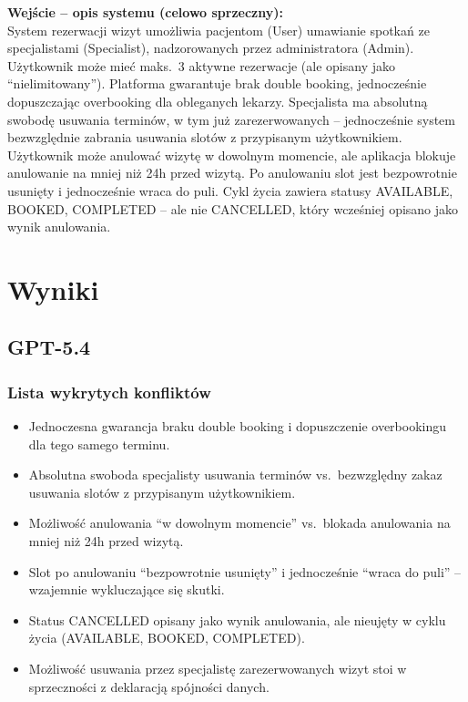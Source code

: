 \documentclass[12pt,a4paper]{article}
\begin{document}
\vspace{0.5em}
\begin{mdframed}[backgroundcolor=metabg, linewidth=0pt, innerleftmargin=10pt, innerrightmargin=10pt, innertopmargin=8pt, innerbottommargin=8pt]
\textbf{Wejście -- opis systemu (celowo sprzeczny):}\\[0.3em]
\small
System rezerwacji wizyt umożliwia pacjentom (User) umawianie spotkań ze specjalistami (Specialist), nadzorowanych przez administratora (Admin). Użytkownik może mieć maks.\ 3 aktywne rezerwacje (ale opisany jako ``nielimitowany''). Platforma gwarantuje brak double booking, jednocześnie dopuszczając overbooking dla obleganych lekarzy. Specjalista ma absolutną swobodę usuwania terminów, w tym już zarezerwowanych -- jednocześnie system bezwzględnie zabrania usuwania slotów z przypisanym użytkownikiem. Użytkownik może anulować wizytę w dowolnym momencie, ale aplikacja blokuje anulowanie na mniej niż 24h przed wizytą. Po anulowaniu slot jest bezpowrotnie usunięty i jednocześnie wraca do puli. Cykl życia zawiera statusy AVAILABLE, BOOKED, COMPLETED -- ale nie CANCELLED, który wcześniej opisano jako wynik anulowania.
\end{mdframed}

\section{Wyniki}

\subsection{\textcolor{gptcolor}{GPT-5.4} }

\subsubsection{Lista wykrytych konfliktów}
\begin{itemize}[leftmargin=1.5em, itemsep=2pt]
  \item Jednoczesna gwarancja braku double booking i dopuszczenie overbookingu dla tego samego terminu.
  \item Absolutna swoboda specjalisty usuwania terminów vs.\ bezwzględny zakaz usuwania slotów z przypisanym użytkownikiem.
  \item Możliwość anulowania ``w dowolnym momencie'' vs.\ blokada anulowania na mniej niż 24h przed wizytą.
  \item Slot po anulowaniu ``bezpowrotnie usunięty'' i jednocześnie ``wraca do puli'' -- wzajemnie wykluczające się skutki.
  \item Status CANCELLED opisany jako wynik anulowania, ale nieujęty w cyklu życia (AVAILABLE, BOOKED, COMPLETED).
  \item Możliwość usuwania przez specjalistę zarezerwowanych wizyt stoi w sprzeczności z deklaracją spójności danych.
\end{itemize}
\end{document}
